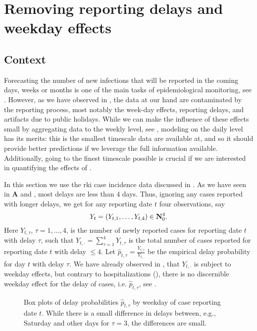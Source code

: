 \section{Removing reporting delays and weekday effects}%
\label{sec:model_reporting_delay}
\subsection{Context}
Forecasting the number of new infections that will be reported in the coming days, weeks or months is one of the main tasks of epidemiological monitoring, see . However, as we have observed in , the data at our hand are contaminated by the reporting process, most notably the week-day effects, reporting delays, and artifacts due to public holidays.
While we can make the influence of these effects small by aggregating data to the weekly level, see , modeling on the daily level has its merits: this is the smallest timescale data are available at, and so it should provide better predictions if we leverage the full information available. Additionally, going to the finest timescale possible is crucial if we are interested in quantifying the effects of .

In this section we use the \acrshort{rki} case incidence data discussed in . As we have seen in  \textbf{A} and , most delays are less than $4$ days. Thus, ignoring any cases reported with longer delays, we get for any reporting date $t$ four observations, say 
$$
    Y_{t} = \left( Y_{t, 1}, \dots, Y_{t, 4} \right) \in \mathbf N^{4}_{0}.
$$
Here $Y_{t,\tau}$, $\tau = 1, \dots, 4$, is the number of newly reported cases for reporting date $t$ with delay $\tau$, such that $Y_{t,\cdot} = \sum_{\tau = 1}^4 Y_{t, \tau}$ is the total number of cases reported for reporting date $t$ with delay $\leq 4$. 
Let $\hat p_{t, \tau} = \frac{Y_{t,\tau}}{Y_{t,\cdot}}$ be the empirical delay probability for day $t$ with delay $\tau$. We have already observed in , that $Y_{t, \cdot}$ is subject to weekday effects, but contrary to hospitalizations (), there is no discernible weekday effect for the delay of cases, i.e. $\hat p_{t,\tau}$, see .

\begin{figure}
    \resizebox{\textwidth}{!}{%
    }
    \caption{Box plots of delay probabilities $\hat p_{t,\tau}$ by weekday of case reporting date $t$. While there is a small difference in delays between, e.g., Saturday and other days for $\tau = 3$, the differences are small.}
    \label{fig:weekday_effect_delays}
\end{figure}

